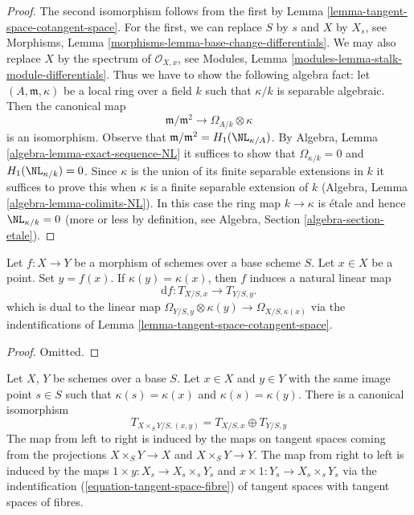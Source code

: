\begin{proof}
The second isomorphism follows from the first by
Lemma \ref{lemma-tangent-space-cotangent-space}.
For the first, we can replace $S$ by $s$ and $X$ by $X_s$, see
Morphisms, Lemma \ref{morphisms-lemma-base-change-differentials}.
We may also replace $X$ by the spectrum of $\mathcal{O}_{X, x}$, see
Modules, Lemma \ref{modules-lemma-stalk-module-differentials}.
Thus we have to show the following algebra fact: let
$(A, \mathfrak m, \kappa)$ be a local ring over a field $k$
such that $\kappa/k$ is separable algebraic. Then the canonical map
$$
\mathfrak m/\mathfrak m^2
\longrightarrow
\Omega_{A/k} \otimes \kappa
$$
is an isomorphism. Observe that
$\mathfrak m/\mathfrak m^2 = H_1(\NL_{\kappa/A})$. By
Algebra, Lemma \ref{algebra-lemma-exact-sequence-NL}
it suffices to show that $\Omega_{\kappa/k} = 0$ and
$H_1(\NL_{\kappa/k}) = 0$. Since $\kappa$ is the union of
its finite separable extensions in $k$ it suffices to prove
this when $\kappa$ is a finite separable extension of $k$
(Algebra, Lemma \ref{algebra-lemma-colimits-NL}).
In this case the ring map $k \to \kappa$ is \'etale
and hence $\NL_{\kappa/k} = 0$ (more or less by definition, see
Algebra, Section \ref{algebra-section-etale}).
\end{proof}

\begin{lemma}
\label{lemma-map-tangent-spaces}
Let $f : X \to Y$ be a morphism of schemes over a base scheme $S$.
Let $x \in X$ be a point. Set $y = f(x)$. If $\kappa(y) = \kappa(x)$,
then $f$ induces a natural linear map
$$
\text{d}f : T_{X/S, x} \longrightarrow T_{Y/S, y}.
$$
which is dual to the linear map
$\Omega_{Y/S, y} \otimes \kappa(y) \to \Omega_{X/S, \kappa(x)}$
via the indentifications of Lemma \ref{lemma-tangent-space-cotangent-space}.
\end{lemma}

\begin{proof}
Omitted.
\end{proof}

\begin{lemma}
\label{lemma-tangent-space-product}
Let $X$, $Y$ be schemes over a base $S$. Let $x \in X$ and $y \in Y$ with
the same image point $s \in S$ such that $\kappa(s) = \kappa(x)$ and
$\kappa(s) = \kappa(y)$. There is a canonical isomorphism
$$
T_{X \times_S Y/S, (x, y)} = T_{X/S, x} \oplus T_{Y/S, y}
$$
The map from left to right is induced by the maps on tangent spaces coming
from the projections $X \times_S Y \to X$ and $X \times_S Y \to Y$.
The map from right to left is induced by the maps
$1 \times y : X_s \to X_s \times_s Y_s$ and
$x \times 1 : Y_s \to X_s \times_s Y_s$ via the indentification
(\ref{equation-tangent-space-fibre}) of
tangent spaces with tangent spaces of fibres.
\end{lemma}

